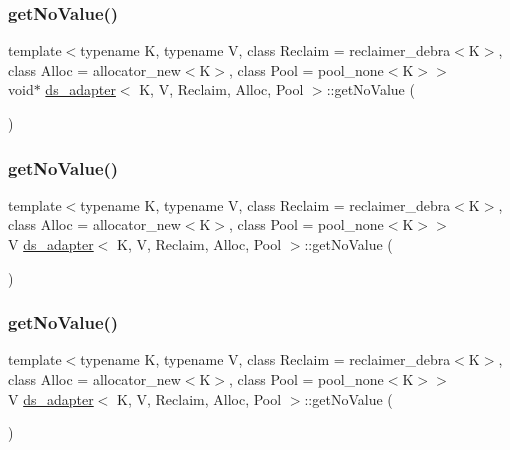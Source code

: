 \subsubsection{\texorpdfstring{get\+No\+Value()}{getNoValue()}\hspace{0.1cm}{\footnotesize\ttfamily [14/26]}}
{\footnotesize\ttfamily template$<$typename K, typename V, class Reclaim = reclaimer\+\_\+debra$<$\+K$>$, class Alloc = allocator\+\_\+new$<$\+K$>$, class Pool = pool\+\_\+none$<$\+K$>$$>$ \\
void$\ast$ \hyperlink{classds__adapter}{ds\+\_\+adapter}$<$ K, V, Reclaim, Alloc, Pool $>$\+::get\+No\+Value (\begin{DoxyParamCaption}{ }\end{DoxyParamCaption})\hspace{0.3cm}{\ttfamily [inline]}}

\mbox{\label{classds__adapter_a9e1e4aec136b351d1a6820d70484a6c5}} 
\subsubsection{\texorpdfstring{get\+No\+Value()}{getNoValue()}\hspace{0.1cm}{\footnotesize\ttfamily [15/26]}}
{\footnotesize\ttfamily template$<$typename K, typename V, class Reclaim = reclaimer\+\_\+debra$<$\+K$>$, class Alloc = allocator\+\_\+new$<$\+K$>$, class Pool = pool\+\_\+none$<$\+K$>$$>$ \\
V \hyperlink{classds__adapter}{ds\+\_\+adapter}$<$ K, V, Reclaim, Alloc, Pool $>$\+::get\+No\+Value (\begin{DoxyParamCaption}{ }\end{DoxyParamCaption})\hspace{0.3cm}{\ttfamily [inline]}}

\mbox{\label{classds__adapter_a9e1e4aec136b351d1a6820d70484a6c5}} 
\subsubsection{\texorpdfstring{get\+No\+Value()}{getNoValue()}\hspace{0.1cm}{\footnotesize\ttfamily [16/26]}}
{\footnotesize\ttfamily template$<$typename K, typename V, class Reclaim = reclaimer\+\_\+debra$<$\+K$>$, class Alloc = allocator\+\_\+new$<$\+K$>$, class Pool = pool\+\_\+none$<$\+K$>$$>$ \\
V \hyperlink{classds__adapter}{ds\+\_\+adapter}$<$ K, V, Reclaim, Alloc, Pool $>$\+::get\+No\+Value (\begin{DoxyParamCaption}{ }\end{DoxyParamCaption})\hspace{0.3cm}{\ttfamily [inline]}}

